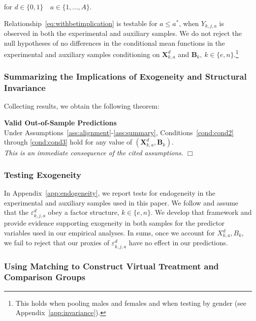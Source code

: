 \noindent for $d \in \{0,1\} \quad  a \in \{1,\dots,A\}$.

Relationship~\eqref{eq:withbetimplication} is testable for $a \leq a^*$, when $Y_{k,j,a}$ is observed in both the experimental and auxiliary samples. We do not reject the null hypotheses of no differences in the conditional mean functions in the experimental and auxiliary samples conditioning on $\bm{X}_{k,a}^d$ and $\bm{B}_k, \: k \in \{e,n\}$.\footnote{This holds when pooling males and females and when testing by gender (see  Appendix~\ref{app:invariance}).}


\subsubsection{Summarizing the Implications of Exogeneity and Structural Invariance}

Collecting results, we obtain the following theorem:

\onehalfspacing
\setcounter{theorem}{0}
\begin{theorem}\label{theorem:main} \textbf{Valid Out-of-Sample Predictions} \\
Under Assumptions~\ref{ass:alignment}-\ref{ass:summary}, Conditions~\ref{cond:cond2} through \ref{cond:cond3} hold for any value of $\left( \bm{X}^d_{k,a}, \bm{B}_k \right)$. \\
\emph{This is an immediate consequence of the cited assumptions.} $\Box$
\end{theorem}
\doublespacing

\subsubsection{Testing Exogeneity}\label{section:accendog}

In  Appendix~\ref{app:endogeneity}, we report tests for endogeneity in the experimental and auxiliary samples used in this paper. We follow \citet{Heckman_Pinto_etal_2013_PerryFactor} and assume that the $\varepsilon_{k,j,a}^d$ obey a factor structure, $k \in \{e,n\}$. We develop that framework and provide evidence supporting exogeneity in both samples for the predictor variables used in our empirical analyses. In sums, once we account for $X_{k,a}^d, B_{k}$, we fail to reject that our proxies of $\varepsilon_{k,j,a}^d$ have no effect in our predictions.

\subsubsection{Using Matching to Construct Virtual Treatment and Comparison Groups}\label{usingmatching}

